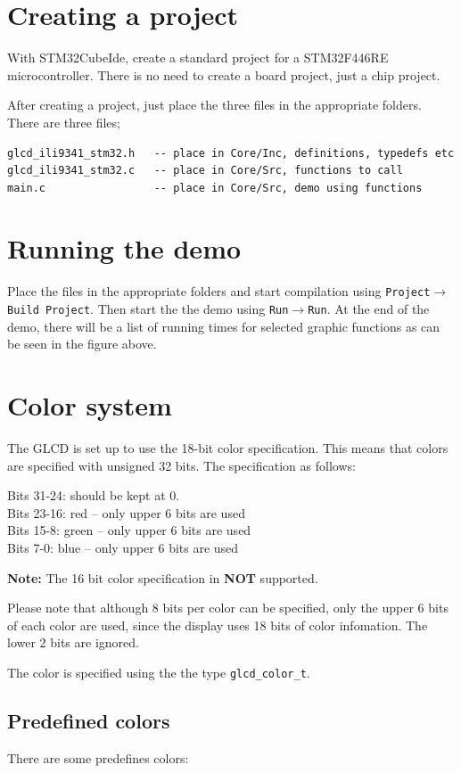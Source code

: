 \documentclass[12pt]{article}
\begin{document}
\section{Creating a project}
With STM32CubeIde, create a standard project for a STM32F446RE microcontroller. There is no need to
create a board project, just a chip project. 

After creating a project, just place the three files in the appropriate folders. There are three files;

\begin{lstlisting}
glcd_ili9341_stm32.h   -- place in Core/Inc, definitions, typedefs etc
glcd_ili9341_stm32.c   -- place in Core/Src, functions to call
main.c                 -- place in Core/Src, demo using functions
\end{lstlisting}

\section{Running the demo}
Place the files in the appropriate folders and start compilation using \texttt{Project}$\rightarrow$\texttt{Build Project}.
Then start the the demo using \texttt{Run}$\rightarrow$\texttt{Run}. At the end of the demo, there will be a list of running times for selected graphic functions as can be seen in the figure above.

\section{Color system}
The GLCD is set up to use the 18-bit color specification. This means that colors are specified with unsigned 32 bits. The specification as follows:

Bits 31-24: should be kept at 0.\\
Bits 23-16: red -- only upper 6 bits are used\\
Bits 15-8: green -- only upper 6 bits are used\\
Bits 7-0: blue -- only upper 6 bits are used

\textbf{Note:} The 16 bit color specification in \textbf{NOT} supported.

Please note that although 8 bits per color can be specified, only the upper 6 bits of each color are used, since the display uses 18 bits of color infomation. The lower 2 bits are ignored.

The color is specified using the the type \lstinline|glcd_color_t|.

\subsection{Predefined colors}
There are some predefines colors:
\end{document}
